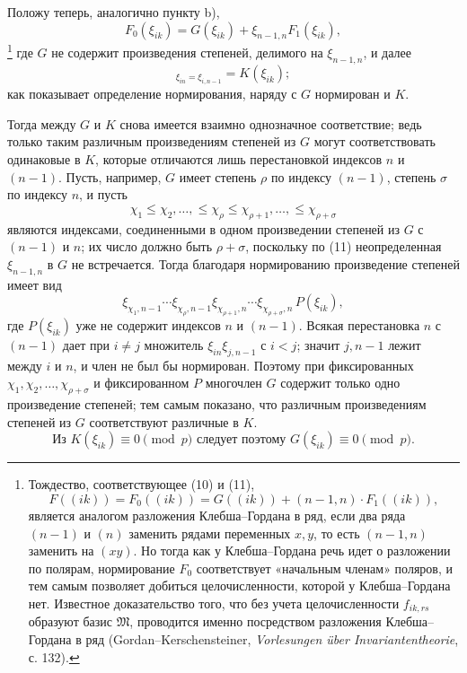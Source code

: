 \documentclass[11pt]{article}
\providecommand{\frM}{\mathfrak M}
\begin{document}
Положу теперь, аналогично пункту b),
\begin{equation}
        F_0(\xi_{ik})=G(\xi_{ik})+\xi_{n-1,n}F_1(\xi_{ik}),
\end{equation}
\footnote{Тождество, соответствующее (10) и (11),
        \[
          F((ik))=F_0((ik))=G((ik))+(n-1,n)\cdot F_1((ik)),
        \]
        является аналогом разложения Клебша--Гордана в ряд, если два ряда \((n-1)\) и \((n)\) заменить рядами переменных \(x,y\), то есть \((n-1,n)\) заменить на \((xy)\). Но тогда как у Клебша--Гордана речь идет о разложении по полярам, нормирование \(F_0\) соответствует «начальным членам» поляров, и тем самым позволяет добиться целочисленности, которой у Клебша--Гордана нет. Известное доказательство того, что без учета целочисленности \(f_{ik,rs}\) образуют базис \(\frM\), проводится именно посредством разложения Клебша--Гордана в ряд (Gordan--Kerschensteiner, \emph{Vorlesungen über Invariantentheorie}, с. 132).}
где \(G\) не содержит произведения степеней, делимого на \(\xi_{n-1,n}\), и далее
\begin{equation}
        [G]_{\xi_{in}=\xi_{i,n-1}}=K(\xi_{ik});
\end{equation}
как показывает определение нормирования, наряду с \(G\) нормирован и \(K\).

Тогда между \(G\) и \(K\) снова имеется взаимно однозначное соответствие; ведь только таким различным произведениям степеней из \(G\) могут соответствовать одинаковые в \(K\), которые отличаются лишь перестановкой индексов \(n\) и \((n-1)\). Пусть, например, \(G\) имеет степень \(\rho\) по индексу \((n-1)\), степень \(\sigma\) по индексу \(n\), и пусть
\[
        \chi_1\le\chi_2,\ldots,\le\chi_\rho\le\chi_{\rho+1},\ldots,\le\chi_{\rho+\sigma}
\]
являются индексами, соединенными в одном произведении степеней из \(G\) с \((n-1)\) и \(n\); их число должно быть \(\rho+\sigma\), поскольку по (11) неопределенная \(\xi_{n-1,n}\) в \(G\) не встречается. Тогда благодаря нормированию произведение степеней имеет вид
\[
        \xi_{\chi_1,n-1}\cdots\xi_{\chi_\rho,n-1}
        \xi_{\chi_{\rho+1},n}\cdots\xi_{\chi_{\rho+\sigma},n}\,P(\xi_{ik}),
\]
где \(P(\xi_{ik})\) уже не содержит индексов \(n\) и \((n-1)\). Всякая перестановка \(n\) с \((n-1)\) дает при \(i\ne j\) множитель \(\xi_{in}\xi_{j,n-1}\) с \(i<j\); значит \(j,n-1\) лежит между \(i\) и \(n\), и член не был бы нормирован. Поэтому при фиксированных \(\chi_1,\chi_2,\ldots,\chi_{\rho+\sigma}\) и фиксированном \(P\) многочлен \(G\) содержит только одно произведение степеней; тем самым показано, что различным произведениям степеней из \(G\) соответствуют различные в \(K\).
\begin{equation}
        \text{Из }K(\xi_{ik})\equiv0\pmod p\text{ следует поэтому }G(\xi_{ik})\equiv0\pmod p.
\end{equation}
\end{document}
